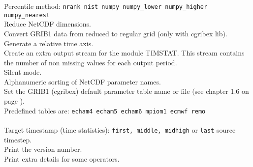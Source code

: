 \begin{tabbing}
\makebox[1.5in][l]{\hspace*{1cm}}
         \> Percentile method: \texttt{nrank nist numpy numpy\_lower numpy\_higher numpy\_nearest} \\
         \> Reduce NetCDF dimensions. \\
         \> Convert GRIB1 data from reduced to regular grid (only with cgribex lib). \\
         \> Generate a relative time axis. \\
         \> Create an extra output stream for the module TIMSTAT. This stream contains  \\
         \> the number of non missing values for each output period. \\
         \> Silent mode. \\
         \> Alphanumeric sorting of NetCDF parameter names. \\
         \> Set the GRIB1 (cgribex) default parameter table name or file (see chapter 1.6 on page \pageref{PARAMETER_TABLE}).\\
         \> Predefined tables are:  \texttt{echam4 echam5 echam6 mpiom1 ecmwf remo}\\
         \> \\
\makebox[1.5in][l]{\hspace*{1cm}}
         \> Target timestamp (time statistics): \texttt{first, middle, midhigh} or \texttt{last} source timestep. \\
         \> Print the version number. \\
         \> Print extra details for some operators. \\

\end{tabbing}
